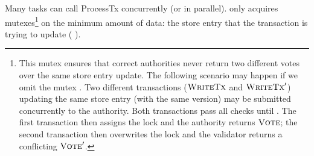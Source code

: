 %
Many tasks can call \textsf{ProcessTx} concurrently (or in parallel). \sysname only acquires mutexes\footnote{
    This mutex ensures that correct authorities never return two different votes over the same store entry update. The following scenario may happen if we omit the mutex . Two different transactions ($\textsc{WriteTx}$ and $\textsc{WriteTx}'$) updating the same store entry (with the same version) may be submitted concurrently to the authority. Both transactions pass all checks until . The first transaction then assigns the lock  and the authority returns $\textsc{Vote}$; the second transaction then overwrites the lock and the validator returns a conflicting $\textsc{Vote}'$.
}
on the minimum amount of data: the store entry that the transaction is trying to update ( ).

